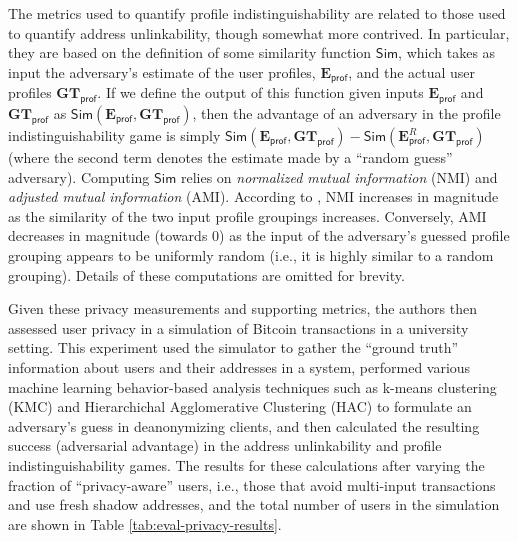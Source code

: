 The metrics used to quantify profile indistinguishability are related to those used to quantify address unlinkability, though somewhat more contrived. In particular, they are based on the definition of some similarity function $\mathsf{Sim}$, which takes as input the adversary's estimate of the user profiles, $\mathbf{E}_\mathsf{prof}$, and the actual user profiles $\mathbf{GT}_\mathsf{prof}$. If we define the output of this function given inputs $\mathbf{E}_\mathsf{prof}$ and $\mathbf{GT}_\mathsf{prof}$ as $\mathsf{Sim}(\mathbf{E}_\mathsf{prof}, \mathbf{GT}_\mathsf{prof})$, then the advantage of an adversary in the profile indistinguishability game is simply $\mathsf{Sim}(\mathbf{E}_\mathsf{prof}, \mathbf{GT}_\mathsf{prof}) - \mathsf{Sim}(\mathbf{E}_\mathsf{prof}^R, \mathbf{GT}_\mathsf{prof})$ (where the second term denotes the estimate made by a ``random guess'' adversary). Computing $\mathsf{Sim}$ relies on \emph{normalized mutual information} (NMI) and \emph{adjusted mutual information} (AMI). According to \cite{19,20}, NMI increases in magnitude as the similarity of the two input profile groupings increases. Conversely, AMI decreases in magnitude (towards 0) as the input of the adversary's guessed profile grouping appears to be uniformly random (i.e., it is highly similar to a random grouping). Details of these computations are omitted for brevity. 

Given these privacy measurements and supporting metrics, the authors then assessed user privacy in a simulation of Bitcoin transactions in a university setting. This experiment used the simulator to gather the ``ground truth'' information about users and their addresses in a system, performed various machine learning behavior-based analysis techniques such as k-means clustering (KMC) and Hierarchichal Agglomerative Clustering (HAC) to formulate an adversary's guess in deanonymizing clients, and then calculated the resulting success (adversarial advantage) in the address unlinkability and profile indistinguishability games. The results for these calculations after varying the fraction of ``privacy-aware'' users, i.e., those that avoid multi-input transactions and use fresh shadow addresses, and the total number of users in the simulation are shown in Table \ref{tab:eval-privacy-results}.


\cite{Androulaki12-privacy}

